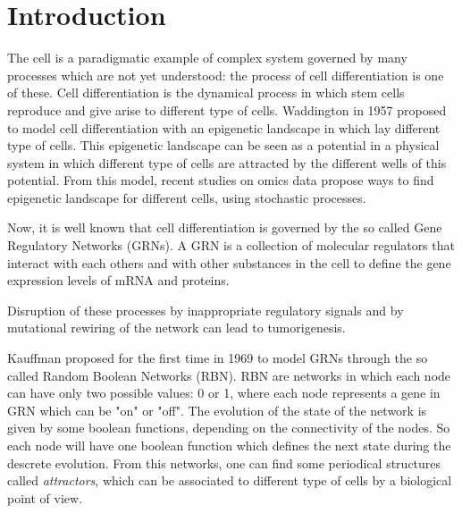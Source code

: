 \chapter*{Introduction}                 %

The cell is a paradigmatic example of complex system governed by many processes which are not yet understood: the process of cell differentiation is one of these. 
Cell differentiation is the dynamical process in which stem cells reproduce and give arise to different type of cells.
Waddington in 1957 \cite{K13} proposed to model cell differentiation with an epigenetic landscape in which lay different type of cells. 
This epigenetic landscape can be seen as a potential in a physical system in which different type of cells are attracted by the different wells of this potential.
From this model, recent studies on omics data propose ways to find epigenetic landscape for different cells\cite{K10}\cite{K11}\cite{K12}, using stochastic processes.

Now, it is well known that cell differentiation is governed by the so called Gene Regulatory Networks (GRNs).
A GRN is a collection of molecular regulators that interact with each others and with other substances in the cell to define the gene expression levels of mRNA and proteins. 

Disruption of these processes by inappropriate regulatory signals and by mutational rewiring of the
network can lead to tumorigenesis\cite{K4}. 

Kauffman proposed for the first time in 1969\cite{K1} to model GRNs through the so called Random Boolean Networks (RBN).
RBN are networks in which each node can have only two possible values: 0 or 1, where each node represents a gene in GRN which can be "on" or "off"\cite{K5}.
The evolution of the state of the network is given by some boolean functions, depending on the connectivity of the nodes. So each node will have one boolean function which defines the next state during the descrete evolution.
From this networks, one can find some periodical structures called \emph{attractors}, which can be associated to different type of cells by a biological point of view\cite{K2}\cite{K3}\cite{K9}.

